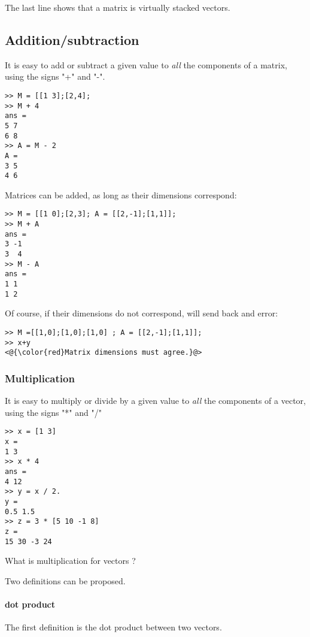 The last line shows that a matrix is virtually stacked vectors.


\subsection{Addition/subtraction}
It is easy to add or subtract a given value to \emph{all} the components of a matrix, using the signs "+" and "-".

\begin{lstlisting}
>> M = [[1 3];[2,4];
>> M + 4
ans =
5 7
6 8
>> A = M - 2
A =
3 5
4 6
\end{lstlisting}


Matrices can be added, as long as their dimensions correspond:

\begin{lstlisting}
>> M = [[1 0];[2,3]; A = [[2,-1];[1,1]];
>> M + A
ans =
3 -1
3  4
>> M - A
ans =
1 1
1 2
\end{lstlisting}

Of course, if their dimensions do not correspond, \matlab will send back and error:

\begin{lstlisting}
>> M =[[1,0];[1,0];[1,0] ; A = [[2,-1];[1,1]];
>> x+y
<@{\color{red}Matrix dimensions must agree.}@>
\end{lstlisting}



\subsubsection{Multiplication}
It is easy to multiply or divide by a given value to \emph{all} the components of a vector, using the signs "*" and "/"

\begin{lstlisting}
>> x = [1 3]
x = 
1 3
>> x * 4
ans =
4 12
>> y = x / 2.
y =
0.5 1.5
>> z = 3 * [5 10 -1 8]
z = 
15 30 -3 24
\end{lstlisting}

What is multiplication for vectors ?

Two definitions can be proposed.

\paragraph{dot product}
The first definition is the dot product between two vectors.


